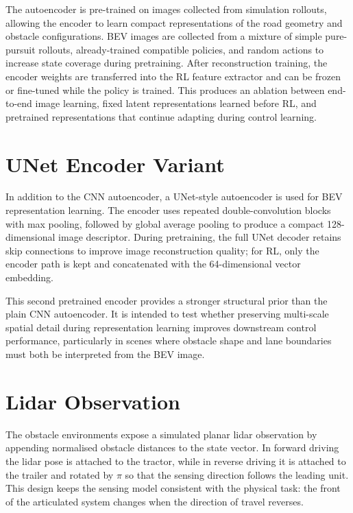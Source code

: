 The autoencoder is pre-trained on images collected from simulation rollouts, allowing the encoder to learn compact representations of the road geometry and obstacle configurations. BEV images are collected from a mixture of simple pure-pursuit rollouts, already-trained compatible policies, and random actions to increase state coverage during pretraining. After reconstruction training, the encoder weights are transferred into the RL feature extractor and can be frozen or fine-tuned while the policy is trained. This produces an ablation between end-to-end image learning, fixed latent representations learned before RL, and pretrained representations that continue adapting during control learning.

\section{UNet Encoder Variant}

In addition to the CNN autoencoder, a UNet-style autoencoder is used for BEV representation learning. The encoder uses repeated double-convolution blocks with max pooling, followed by global average pooling to produce a compact 128-dimensional image descriptor. During pretraining, the full UNet decoder retains skip connections to improve image reconstruction quality; for RL, only the encoder path is kept and concatenated with the 64-dimensional vector embedding.

This second pretrained encoder provides a stronger structural prior than the plain CNN autoencoder. It is intended to test whether preserving multi-scale spatial detail during representation learning improves downstream control performance, particularly in scenes where obstacle shape and lane boundaries must both be interpreted from the BEV image.

\section{Lidar Observation}

The obstacle environments expose a simulated planar lidar observation by appending normalised obstacle distances to the state vector. In forward driving the lidar pose is attached to the tractor, while in reverse driving it is attached to the trailer and rotated by $\pi$ so that the sensing direction follows the leading unit. This design keeps the sensing model consistent with the physical task: the front of the articulated system changes when the direction of travel reverses.

